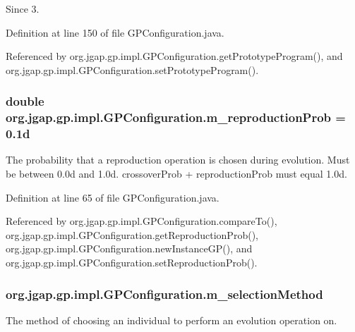 \begin{DoxySince}{Since}
3. 
\end{DoxySince}


Definition at line 150 of file G\-P\-Configuration.\-java.



Referenced by org.\-jgap.\-gp.\-impl.\-G\-P\-Configuration.\-get\-Prototype\-Program(), and org.\-jgap.\-gp.\-impl.\-G\-P\-Configuration.\-set\-Prototype\-Program().

\hypertarget{classorg_1_1jgap_1_1gp_1_1impl_1_1_g_p_configuration_a458e34d63b6669e2d71c76b335c143da}{
\subsubsection[{m\-\_\-reproduction\-Prob}]{\setlength{\rightskip}{0pt plus 5cm}double org.\-jgap.\-gp.\-impl.\-G\-P\-Configuration.\-m\-\_\-reproduction\-Prob = 0.\-1d\hspace{0.3cm}{\ttfamily [private]}}}\label{classorg_1_1jgap_1_1gp_1_1impl_1_1_g_p_configuration_a458e34d63b6669e2d71c76b335c143da}
The probability that a reproduction operation is chosen during evolution. Must be between 0.\-0d and 1.\-0d. crossover\-Prob + reproduction\-Prob must equal 1.\-0d. 

Definition at line 65 of file G\-P\-Configuration.\-java.



Referenced by org.\-jgap.\-gp.\-impl.\-G\-P\-Configuration.\-compare\-To(), org.\-jgap.\-gp.\-impl.\-G\-P\-Configuration.\-get\-Reproduction\-Prob(), org.\-jgap.\-gp.\-impl.\-G\-P\-Configuration.\-new\-Instance\-G\-P(), and org.\-jgap.\-gp.\-impl.\-G\-P\-Configuration.\-set\-Reproduction\-Prob().

\hypertarget{classorg_1_1jgap_1_1gp_1_1impl_1_1_g_p_configuration_a0db94da3ece7fbce1e078889bc91cef0}{
\subsubsection[{m\-\_\-selection\-Method}]{ org.\-jgap.\-gp.\-impl.\-G\-P\-Configuration.\-m\-\_\-selection\-Method\hspace{0.3cm}{\ttfamily [private]}}}\label{classorg_1_1jgap_1_1gp_1_1impl_1_1_g_p_configuration_a0db94da3ece7fbce1e078889bc91cef0}
The method of choosing an individual to perform an evolution operation on. 

